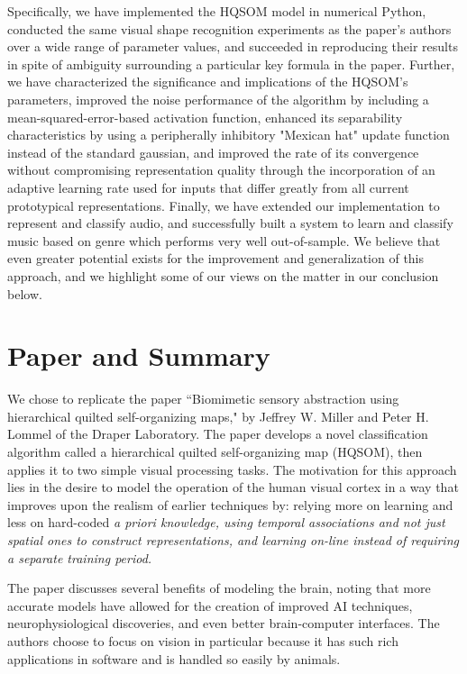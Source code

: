 \documentclass[a4paper,10pt]{article}
\begin{document}
Specifically, we have implemented the HQSOM model in numerical Python, conducted the same visual
shape recognition experiments as the paper's authors over a wide range of parameter values, and
succeeded in reproducing their results in spite of ambiguity surrounding a particular key formula in
the paper. Further, we have characterized the significance and implications of the HQSOM's
parameters, improved the noise performance of the algorithm by including a mean-squared-error-based
activation function, enhanced its separability characteristics by using a peripherally inhibitory
"Mexican hat" update function instead of the standard gaussian, and improved the rate of its
convergence without compromising representation quality through the incorporation of an adaptive
learning rate used for inputs that differ greatly from all current prototypical representations.
Finally, we have extended our implementation to represent and classify audio, and successfully built
a system to learn and classify music based on genre which performs very well out-of-sample. We
believe that even greater potential exists for the improvement and generalization of this approach,
and we highlight some of our views on the matter in our conclusion below.

\section{Paper and Summary}

We chose to replicate the paper ``Biomimetic sensory abstraction using hierarchical quilted
self-organizing maps," by Jeffrey W. Miller and Peter H. Lommel of the Draper Laboratory. The paper
develops a novel classification algorithm called a hierarchical quilted self-organizing map (HQSOM),
then applies it to two simple visual processing tasks. The motivation for this approach lies in the
desire to model the operation of the human visual cortex in a way that improves upon the realism of
earlier techniques by: relying more on learning and less on hard-coded \em a priori \em knowledge,
using temporal associations and not just spatial ones to construct representations, and learning
on-line instead of requiring a separate training period.

The paper discusses several benefits of modeling the brain, noting that more accurate models have
allowed for the creation of improved AI techniques, neurophysiological discoveries, and even better
brain-computer interfaces. The authors choose to focus on vision in particular because it has such
rich applications in software and is handled so easily by animals.
\end{document}
